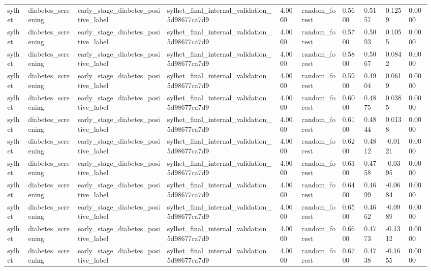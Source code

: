 \begin{tabular}{llllllllll}
sylhet & diabetes\_screening & early\_stage\_diabetes\_positive\_label & sylhet\_final\_internal\_validation\_5d98677ca7d9 & 4.0000 & random\_forest & 0.5600 & 0.5157 & 0.1259 & 0.0000 \\
sylhet & diabetes\_screening & early\_stage\_diabetes\_positive\_label & sylhet\_final\_internal\_validation\_5d98677ca7d9 & 4.0000 & random\_forest & 0.5700 & 0.5093 & 0.1055 & 0.0000 \\
sylhet & diabetes\_screening & early\_stage\_diabetes\_positive\_label & sylhet\_final\_internal\_validation\_5d98677ca7d9 & 4.0000 & random\_forest & 0.5800 & 0.5067 & 0.0842 & 0.0000 \\
sylhet & diabetes\_screening & early\_stage\_diabetes\_positive\_label & sylhet\_final\_internal\_validation\_5d98677ca7d9 & 4.0000 & random\_forest & 0.5900 & 0.4904 & 0.0619 & 0.0000 \\
sylhet & diabetes\_screening & early\_stage\_diabetes\_positive\_label & sylhet\_final\_internal\_validation\_5d98677ca7d9 & 4.0000 & random\_forest & 0.6000 & 0.4875 & 0.0385 & 0.0000 \\
sylhet & diabetes\_screening & early\_stage\_diabetes\_positive\_label & sylhet\_final\_internal\_validation\_5d98677ca7d9 & 4.0000 & random\_forest & 0.6100 & 0.4844 & 0.0138 & 0.0000 \\
sylhet & diabetes\_screening & early\_stage\_diabetes\_positive\_label & sylhet\_final\_internal\_validation\_5d98677ca7d9 & 4.0000 & random\_forest & 0.6200 & 0.4812 & -0.0121 & 0.0000 \\
sylhet & diabetes\_screening & early\_stage\_diabetes\_positive\_label & sylhet\_final\_internal\_validation\_5d98677ca7d9 & 4.0000 & random\_forest & 0.6300 & 0.4758 & -0.0395 & 0.0000 \\
sylhet & diabetes\_screening & early\_stage\_diabetes\_positive\_label & sylhet\_final\_internal\_validation\_5d98677ca7d9 & 4.0000 & random\_forest & 0.6400 & 0.4699 & -0.0684 & 0.0000 \\
sylhet & diabetes\_screening & early\_stage\_diabetes\_positive\_label & sylhet\_final\_internal\_validation\_5d98677ca7d9 & 4.0000 & random\_forest & 0.6500 & 0.4662 & -0.0989 & 0.0000 \\
sylhet & diabetes\_screening & early\_stage\_diabetes\_positive\_label & sylhet\_final\_internal\_validation\_5d98677ca7d9 & 4.0000 & random\_forest & 0.6600 & 0.4773 & -0.1312 & 0.0000 \\
sylhet & diabetes\_screening & early\_stage\_diabetes\_positive\_label & sylhet\_final\_internal\_validation\_5d98677ca7d9 & 4.0000 & random\_forest & 0.6700 & 0.4738 & -0.1655 & 0.0000 \\

\end{tabular}
